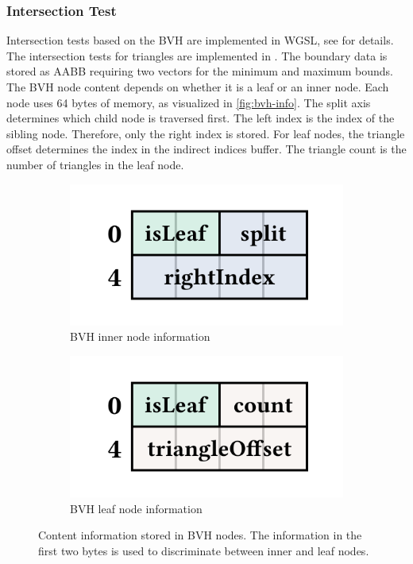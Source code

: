 \subsubsection{Intersection Test}
\label{sec:bvh-implementation}

Intersection tests based on the \gls{BVH} are implemented in \gls{WGSL}, see  for details. The intersection tests for triangles are implemented in . The boundary data is stored as \gls{AABB} requiring two vectors for the minimum and maximum bounds. The \gls{BVH} node content depends on whether it is a leaf or an inner node. Each node uses 64 bytes of memory, as visualized in \autoref{fig:bvh-info}. The split axis determines which child node is traversed first. The left index is the index of the sibling node. Therefore, only the right index is stored. For leaf nodes, the triangle offset determines the index in the indirect indices buffer. The triangle count is the number of triangles in the leaf node.

\begin{figure}[H]
    \centering
    \begin{subfigure}[b]{0.45\textwidth}
        \includegraphics[width=\textwidth]{resources/bvh-node-info.png}
        \caption{\gls{BVH} inner node information}
        \label{fig:bvh-info-inner-node}
    \end{subfigure}
    \hfill
    \begin{subfigure}[b]{0.45\textwidth}
        \includegraphics[width=\textwidth]{resources/bvh-leaf-info.png}
        \caption{\gls{BVH} leaf node information}
        \label{fig:bvh-info-leaf-node}
    \end{subfigure}
    \caption{Content information stored in \gls{BVH} nodes. The information in the first two bytes is used to discriminate between inner and leaf nodes.}
    \label{fig:bvh-info}
\end{figure}

